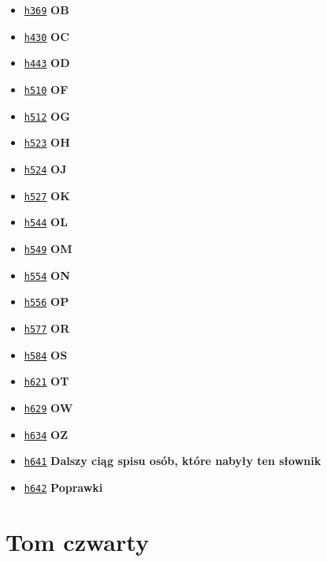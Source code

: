 \documentclass[12]{mwart}
\begin{document}
\begin{itemize}
\begin{itemize}
    \item \href{\paiii{3}{371}}{\texttt{h369}} \textbf{OB}
    \item \href{\paiii{3}{432}}{\texttt{h430}} \textbf{OC}
    \item \href{\paiii{3}{445}}{\texttt{h443}} \textbf{OD}
    \item \href{\paiii{3}{512}}{\texttt{h510}} \textbf{OF}
    \item \href{\paiii{3}{514}}{\texttt{h512}} \textbf{OG}
    \item \href{\paiii{3}{525}}{\texttt{h523}} \textbf{OH}
    \item \href{\paiii{3}{526}}{\texttt{h524}} \textbf{OJ}
    \item \href{\paiii{3}{529}}{\texttt{h527}} \textbf{OK}
    \item \href{\paiii{3}{546}}{\texttt{h544}} \textbf{OL}
    \item \href{\paiii{3}{551}}{\texttt{h549}} \textbf{OM}
    \item \href{\paiii{3}{556}}{\texttt{h554}} \textbf{ON}
    \item \href{\paiii{3}{558}}{\texttt{h556}} \textbf{OP}
    \item \href{\paiii{3}{579}}{\texttt{h577}} \textbf{OR}
    \item \href{\paiii{3}{586}}{\texttt{h584}} \textbf{OS}
    \item \href{\paiii{3}{623}}{\texttt{h621}} \textbf{OT}
    \item \href{\paiii{3}{631}}{\texttt{h629}} \textbf{OW}
    \item \href{\paiii{3}{636}}{\texttt{h634}} \textbf{OZ}
    \end{itemize}
\end{itemize}

\begin{itemize}
\item \href{\paiii{3}{643}}{\texttt{h641}} \textbf{Dalszy ciąg spisu
    osób, które nabyły ten słownik}
\item \href{\paiii{3}{644}}{\texttt{h642}} \textbf{Poprawki}
\end{itemize}


\section{Tom czwarty}

\newcommand{\paiv}[2]{http://teksty.klf.uw.edu.pl/20/14/LindeIIGP#1ocri.djvu?djvuopts=\&page=#2\&zoom=page}
\end{document}
